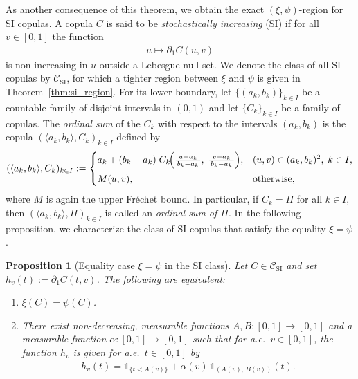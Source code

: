 \documentclass{article}
\newtheorem{proposition}[theorem]{Proposition}
\newcommand{\1}{\mathds{1}}
\newcommand{\CC}{\mathcal{C}}  %
\newcommand{\MC}{M}            %
\begin{document}
As another consequence of this theorem, we obtain the exact $(\xi,\psi)$-region for SI copulas.
A copula \(C\) is said to be \emph{stochastically increasing} (SI) if for all $v\in[0,1]$ the function
\begin{align}\label{eq:si_definition}
u \mapsto \partial_1 C(u,v)
\end{align}
is non-increasing in $u$ outside a Lebesgue-null set.
We denote the class of all SI copulas by \(\CC_{\mathrm{SI}}\), for which a tighter region between \(\xi\) and \(\psi\) is given in Theorem~\ref{thm:si_region}.
For its lower boundary, let $\{(a_k,b_k)\}_{k\in I}$ be a countable family of disjoint intervals in $(0,1)$ and let $\{C_k\}_{k\in I}$ be a family of copulas.
The \emph{ordinal sum} of the $C_k$ with respect to the intervals $(a_k,b_k)$ is the copula $(\langle a_k, b_k \rangle, C_k)_{k\in I}$ defined by
\begin{align}\label{eq:ordinal_sum}
(\langle a_k, b_k \rangle, C_k)_{k\in I}  :=
\begin{cases}
a_k + (b_k - a_k)\;
C_k\!\Bigl(\tfrac{u - a_k}{\,b_k - a_k\,},\;\tfrac{v - a_k}{\,b_k - a_k\,}\Bigr),
& (u,v)\in (a_k,b_k)^2,\;k\in I,\\[6pt]
\MC(u,v),
& \text{otherwise,}
\end{cases}
\end{align}
where $\MC$ is again the upper Fréchet bound.
In particular, if $C_k=\Pi$ for all $k\in I$, then $(\langle a_k, b_k \rangle, \Pi)_{k\in I}$ is called an \emph{ordinal sum of $\Pi$}.
In the following proposition, we characterize the class of SI copulas that satisfy the equality \(\xi = \psi\).

\begin{proposition}[Equality case $\xi=\psi$ in the SI class]\label{prop:si_equality_structure}
Let $C\in\CC_{\mathrm{SI}}$ and set $h_v(t):=\partial_1 C(t,v)$.
The following are equivalent:
\begin{enumerate}
\item[\textnormal{(i)}] $\xi(C)=\psi(C)$.
\item[\textnormal{(ii)}] There exist non-decreasing, measurable functions $A,B:[0,1]\to[0,1]$ and a measurable function $\alpha:[0,1]\to[0,1]$ such that for a.e.\ $v\in[0,1]$, the function $h_v$ is given for a.e.\ $t\in[0,1]$ by
\begin{align}\label{eq:level_two_form}
  h_v(t)=\1_{\{t<A(v)\}}+\alpha(v)\,\1_{(A(v),\,B(v))}(t).
\end{align}
\end{enumerate}
\end{proposition}
\end{document}
